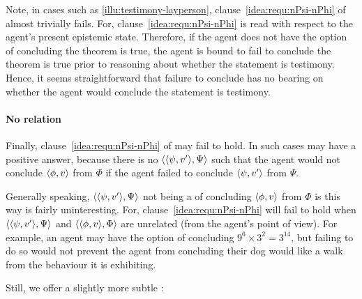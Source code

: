 \begin{note}
  Note, in cases such as \autoref{illu:testimony-layperson}, clause~\ref{idea:requ:nPsi-nPhi} of \iRequ{} almost trivially fails.
  For, clause~\ref{idea:requ:nPsi-nPhi} is read with respect to the agent's present epistemic state.
  Therefore, if the agent does not have the option of concluding the theorem is true, the agent is bound to fail to conclude the theorem is true prior to reasoning about whether the statement is testimony.
  Hence, it seems straightforward that failure to conclude has no bearing on whether the agent would conclude the statement is testimony.
\end{note}

\paragraph{No relation}

\begin{note}
  Finally, clause~\ref{idea:requ:nPsi-nPhi} of \iRequ{} may fail to hold.
  In such cases \qzS{} may have a positive answer, because there is no \(\langle \langle \psi, v' \rangle, \Psi \rangle\) such that the agent would not conclude \(\langle \phi, v \rangle\) from \(\Phi\) if the agent failed to conclude \(\langle \psi, v' \rangle\) from \(\Psi\).

  Generally speaking, \(\langle \langle \psi, v' \rangle, \Psi \rangle\) not being a \requ{} of concluding \(\langle \phi, v \rangle\) from \(\Phi\) is this way is fairly uninteresting.
  For, clause~\ref{idea:requ:nPsi-nPhi} will fail to hold when \(\langle \langle \psi, v' \rangle, \Psi \rangle\) and \(\langle \langle \phi, v \rangle, \Phi \rangle\) are unrelated (from the agent's point of view).
  For example, an agent may have the option of concluding \(9^{6} \times 3^{2} = 3^{14}\), but failing to do so would not prevent the agent from concluding their dog would like a walk from the behaviour it is exhibiting.

  Still, we offer a slightly more subtle :
\end{note}

